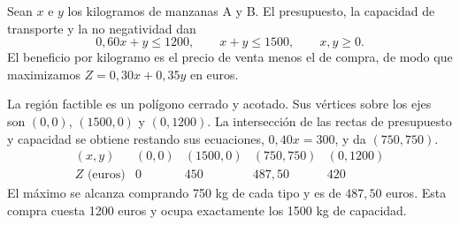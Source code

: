 Sean $x$ e $y$ los kilogramos de manzanas A y B. El presupuesto, la capacidad de transporte y la no negatividad dan
\[
 0{,}60x+y\le1200,\qquad x+y\le1500,\qquad x,y\ge0.
\]
El beneficio por kilogramo es el precio de venta menos el de compra, de modo que maximizamos $Z=0{,}30x+0{,}35y$ en euros.

La región factible es un polígono cerrado y acotado. Sus vértices sobre los ejes son $(0,0)$, $(1500,0)$ y $(0,1200)$. La intersección de las rectas de presupuesto y capacidad se obtiene restando sus ecuaciones, $0{,}40x=300$, y da $(750,750)$.
\[
 \begin{array}{c|rrrr}
 (x,y)&(0,0)&(1500,0)&(750,750)&(0,1200)\\
 Z\text{ (euros)}&0&450&487{,}50&420
 \end{array}
\]
El máximo se alcanza comprando 750 kg de cada tipo y es de $\boxed{487{,}50}$ euros. Esta compra cuesta 1200 euros y ocupa exactamente los 1500 kg de capacidad.
